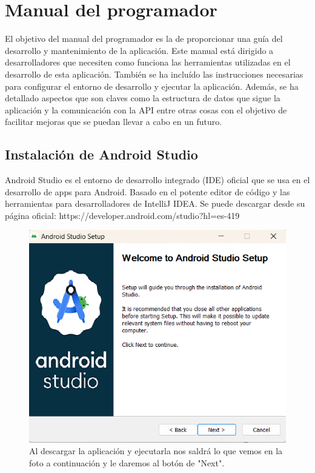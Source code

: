 \section{Manual del programador}
El objetivo del manual del programador es la de proporcionar una guía del desarrollo y mantenimiento de la aplicación. Este manual está dirigido a desarrolladores que necesiten como funciona las herramientas utilizadas en el desarrollo de esta aplicación.
También se ha incluído las instrucciones necesarias para configurar el entorno de desarrollo y ejecutar la aplicación.
Además, se ha detallado aspectos que son claves como la estructura de datos que sigue la aplicación y la comunicación con la API entre otras cosas con el objetivo de facilitar mejoras que se puedan llevar a cabo en un futuro.


\subsection{\textbf{Instalación de Android Studio}}
Android Studio es el entorno de desarrollo integrado (IDE) oficial que se usa en el desarrollo de apps para Android. Basado en el potente editor de código y las herramientas para desarrolladores de IntelliJ IDEA.
Se puede descargar desde su página oficial: https://developer.android.com/studio?hl=es-419



\begin{figure}[H]
    \centering
    \includegraphics[width=0.8\linewidth]{AndroidStudio1.png}
    \caption{Al descargar la aplicación y ejecutarla nos saldrá lo que vemos en la foto a continuación y le daremos al botón de "Next".}
    \label{fig:enter-label}
\end{figure}



